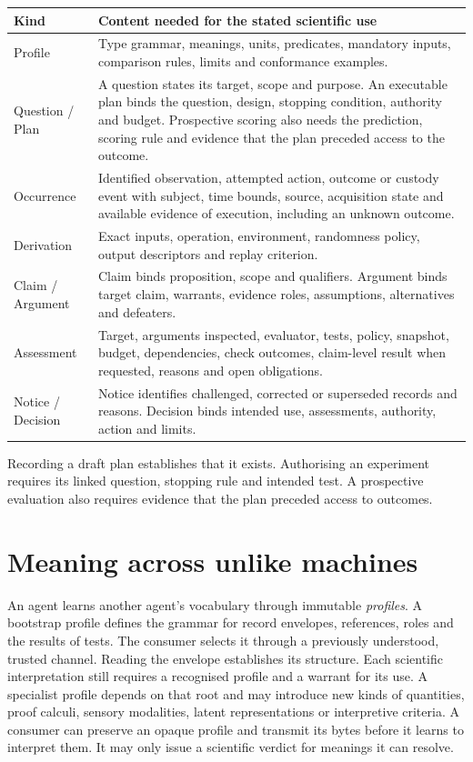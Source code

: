 \documentclass[11pt,a4paper]{article}
\newcommand{\partpage}[1]{\clearpage\section{#1}}
\begin{document}
\small
\begin{tabularx}{\linewidth}{@{}L{.19\linewidth}Y@{}}
\toprule
\textbf{Kind} & \textbf{Content needed for the stated scientific use} \\ \midrule
Profile & Type grammar, meanings, units, predicates, mandatory inputs, comparison rules, limits and conformance examples. \\
Question / Plan & A question states its target, scope and purpose. An executable plan binds the question, design, stopping condition, authority and budget. Prospective scoring also needs the prediction, scoring rule and evidence that the plan preceded access to the outcome. \\
Occurrence & Identified observation, attempted action, outcome or custody event with subject, time bounds, source, acquisition state and available evidence of execution, including an unknown outcome. \\
Derivation & Exact inputs, operation, environment, randomness policy, output descriptors and replay criterion. \\
Claim / Argument & Claim binds proposition, scope and qualifiers. Argument binds target claim, warrants, evidence roles, assumptions, alternatives and defeaters. \\
Assessment & Target, arguments inspected, evaluator, tests, policy, snapshot, budget, dependencies, check outcomes, claim-level result when requested, reasons and open obligations. \\
Notice / Decision & Notice identifies challenged, corrected or superseded records and reasons. Decision binds intended use, assessments, authority, action and limits. \\
\bottomrule
\end{tabularx}
\normalsize

Recording a draft plan establishes that it exists. Authorising an experiment requires its linked question, stopping rule and intended test. A prospective evaluation also requires evidence that the plan preceded access to outcomes.

\partpage{Meaning across unlike machines}\label{sec:meaning}
An agent learns another agent's vocabulary through immutable \emph{profiles}. A bootstrap profile defines the grammar for record envelopes, references, roles and the results of tests. The consumer selects it through a previously understood, trusted channel. Reading the envelope establishes its structure. Each scientific interpretation still requires a recognised profile and a warrant for its use. A specialist profile depends on that root and may introduce new kinds of quantities, proof calculi, sensory modalities, latent representations or interpretive criteria. A consumer can preserve an opaque profile and transmit its bytes before it learns to interpret them. It may only issue a scientific verdict for meanings it can resolve.
\end{document}
